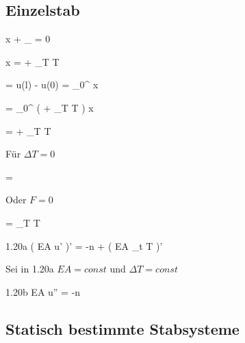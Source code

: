 \documentclass[11pt]{article}
\newcommand{\1}{ {\mathds{1}} }
\begin{document}
\begin{multicols}{3}
		\subsection{Einzelstab}

		\begin{formel}{1.13}
					 {x}
			+
			_{}
			=
			0
		\end{formel}
		\begin{formel}{1.14}
					 {x}
			=
			+
			\alpha_T \Delta T
		\end{formel}
		\begin{formel}{1.15}
			\Delta \ell
			=
			u(l)
			-
			u(0)
			=
			\int_{0}^{\ell}
			\varepsilon
			x
		\end{formel}
		 

		\begin{formel}{1.16}
			\Delta \ell
			=
			\int_{0}^{\ell}
			\left(
				+
				\alpha_T \Delta T
			\right)
			x
		\end{formel}
		\begin{formel}{1.17}
			\Delta \ell
			=
			+
			\alpha_T \Delta T \ell
		\end{formel}

		Für $\Delta T = 0$

		\begin{formel}{1.18}
			\Delta \ell
			=
		\end{formel}

		Oder $F = 0$

		\begin{formel}{1.19}
			\Delta \ell
			=
			\alpha_T \Delta T \ell
		\end{formel}
		\begin{formel}{1.20a}
			\left(
				EA u'
			\right)'
			=
			-n
			+
			\left(
				EA \alpha_t \Delta T
			\right)'
		\end{formel}
		\nopagebreak
		Sei in 1.20a $EA = const$ und $\Delta T = const$\\
		\nopagebreak
		\begin{formel}{1.20b}
			EA u''
			=
			-n
		\end{formel}

		\subsection{Statisch bestimmte Stabsysteme}


\end{multicols}
\end{document}
